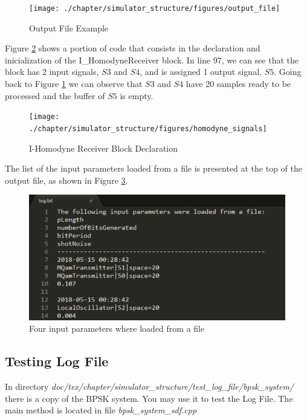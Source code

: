 \begin{refsection}
\renewcommand{\figurename}{Figure}
\begin{figure}[H]
\centering
\texttt{[image: ./chapter/simulator\_structure/figures/output\_file]}
\caption{Output File Example}
\label{fig:outputfile}
\end{figure}

Figure \ref{fig:homodynesignals} shows a portion of code that consists in the declaration and inicialization of the I\_HomodyneReceiver block. In line 97, we can see that the block has 2 input signals, $S3$ and $S4$, and is assigned 1 output signal, $S5$. Going back to Figure \ref{fig:outputfile} we can observe that $S3$ and $S4$ have 20 samples ready to be processed and the buffer of $S5$ is empty.

\renewcommand{\figurename}{Figure}
\begin{figure}[H]
\centering
\texttt{[image: ./chapter/simulator\_structure/figures/homodyne\_signals]}
\caption{I-Homodyne Receiver Block Declaration}
\label{fig:homodynesignals}
\end{figure}

The list of the input parameters loaded from a file is presented at the top of the output file, as shown in Figure \ref{fig:changedinputparameters}.

\begin{figure}[H]
\centering
\includegraphics[width=.50\linewidth]{./chapter/simulator_structure/figures/logfile_input_parameters_changed}
\caption{Four input parameters where loaded from a file}
\label{fig:changedinputparameters}
\end{figure}

\subsection{Testing Log File}
In directory \textit{doc/tex/chapter/simulator\_structure/test\_log\_file/bpsk\_system/} there is a copy of the BPSK system. You may use it to test the Log File. The main method is located in file \textit{bpsk\_system\_sdf.cpp}

\clearpage
\printbibliography[heading=subbibliography]
\end{refsection}
